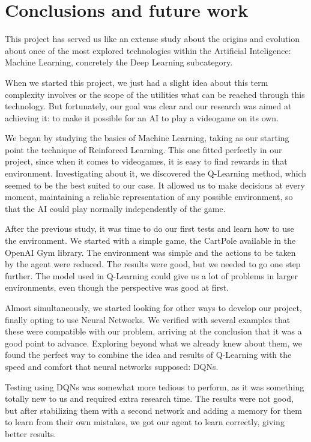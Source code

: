 \chapter{Conclusions and future work}
\label{cap:conclusions}


This project has served us like an extense study about the origins and evolution about once of the most explored technologies within the Artificial Inteligence: Machine Learning, concretely the Deep Learning subcategory.

When we started this project, we just had a slight idea about this term complexity involves or the scope of the utilities what can be reached through this technology. But fortunately, our goal was clear and our research was aimed at achieving it: to make it possible for an AI to play a videogame on its own.

We began by studying the basics of Machine Learning, taking as our starting point the technique of Reinforced Learning. This one fitted perfectly in our project, since when it comes to videogames, it is easy to find rewards in that environment. Investigating about it, we discovered the Q-Learning method, which seemed to be the best suited to our case. It allowed us to make decisions at every moment, maintaining a reliable representation of any possible environment, so that the AI could play normally independently of the game.

After the previous study, it was time to do our first tests and learn how to use the environment. We started with a simple game, the CartPole available in the OpenAI Gym library. The environment was simple and the actions to be taken by the agent were reduced. The results were good, but we needed to go one step further. The model used in Q-Learning could give us a lot of problems in larger environments, even though the perspective was good at first.

Almost simultaneously, we started looking for other ways to develop our project, finally opting to use Neural Networks. We verified with several examples that these were compatible with our problem, arriving at the conclusion that it was a good point to advance. Exploring beyond what we already knew about them, we found the perfect way to combine the idea and results of Q-Learning with the speed and comfort that neural networks supposed: DQNs.

Testing using DQNs was somewhat more tedious to perform, as it was something totally new to us and required extra research time. The results were not good, but after stabilizing them with a second network and adding a memory for them to learn from their own mistakes, we got our agent to learn correctly, giving better results.

